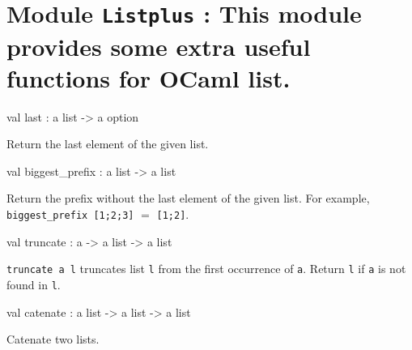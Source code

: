 \documentclass[11pt]{article}
\begin{document}
\tableofcontents
\section{Module {\tt{Listplus}} : This module provides some extra useful functions for OCaml list.}
\label{module:Listplus}




\ocamldocvspace{0.5cm}



\label{val:Listplus.last}\begin{ocamldoccode}
val last : {\textquotesingle}a list -> {\textquotesingle}a option
\end{ocamldoccode}
\begin{ocamldocdescription}
Return the last element of the given list.


\end{ocamldocdescription}




\label{val:Listplus.biggest-underscoreprefix}\begin{ocamldoccode}
val biggest_prefix : {\textquotesingle}a list -> {\textquotesingle}a list
\end{ocamldoccode}
\begin{ocamldocdescription}
Return the prefix without the last element of the given list. 
	For example, {\tt{biggest\_prefix [1;2;3]}} $=$ {\tt{[1;2]}}.


\end{ocamldocdescription}




\label{val:Listplus.truncate}\begin{ocamldoccode}
val truncate : {\textquotesingle}a -> {\textquotesingle}a list -> {\textquotesingle}a list
\end{ocamldoccode}
\begin{ocamldocdescription}
{\tt{truncate a l}} truncates list {\tt{l}} from the first occurrence of {\tt{a}}. 
	Return {\tt{l}} if {\tt{a}} is not found in {\tt{l}}.


\end{ocamldocdescription}




\label{val:Listplus.catenate}\begin{ocamldoccode}
val catenate : {\textquotesingle}a list -> {\textquotesingle}a list -> {\textquotesingle}a list
\end{ocamldoccode}
\begin{ocamldocdescription}
Catenate two lists.


\end{ocamldocdescription}
\end{document}
